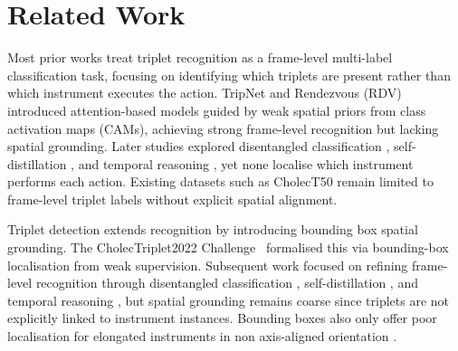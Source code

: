 \section{Related Work}\label{sec::related_works}

Most prior works treat triplet recognition as a frame-level multi-label classification task, focusing on identifying which triplets are present rather than which instrument executes the action. 
TripNet \cite{1nywoye_rec_action_triplets} and Rendezvous (RDV) \cite{NWOYE2022102433_rendevous} introduced attention-based models guided by weak spatial priors from class activation maps (CAMs), achieving strong frame-level recognition but lacking spatial grounding. 
Later studies explored disentangled classification \cite{chen2023surgical}, self-distillation \cite{multi_self_distillation}, and temporal reasoning \cite{sharma2022RendezvousInTime}, yet none localise which instrument performs each action. 
Existing datasets such as CholecT50 \cite{NWOYE2022102433_rendevous} remain limited to frame-level triplet labels without explicit spatial alignment. 


Triplet detection extends recognition by introducing bounding box spatial grounding. 
The CholecTriplet2022 Challenge~\cite{nwoye2023cholectriplet2022} formalised this via bounding-box localisation from weak supervision. 
Subsequent work focused on refining frame-level recognition through disentangled classification \cite{chen2023surgical}, self-distillation \cite{multi_self_distillation}, and temporal reasoning \cite{sharma2022RendezvousInTime,pei2025instrument} , but spatial grounding remains coarse since triplets are not explicitly linked to instrument instances. 
Bounding boxes also only offer poor localisation for elongated instruments in non axis-aligned orientation \cite{han2025robust}.





